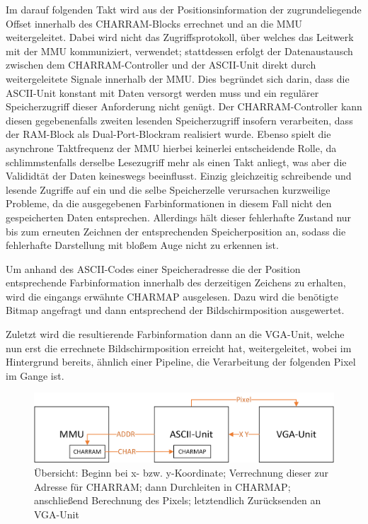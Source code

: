 Im darauf folgenden Takt wird aus der Positionsinformation der zugrundeliegende Offset innerhalb des CHARRAM-Blocks errechnet und an die MMU weitergeleitet. Dabei wird nicht das Zugriffsprotokoll, \"uber welches das Leitwerk mit der MMU kommuniziert, verwendet; stattdessen erfolgt der Datenaustausch zwischen dem CHARRAM-Controller und der ASCII-Unit direkt durch weitergeleitete Signale innerhalb der MMU. Dies begr\"undet sich darin, dass die ASCII-Unit konstant mit Daten versorgt werden muss und ein regul\"arer Speicherzugriff dieser Anforderung nicht gen\"ugt. Der CHARRAM-Controller kann diesen gegebenenfalls zweiten lesenden Speicherzugriff insofern verarbeiten, dass der RAM-Block als Dual-Port-Blockram realisiert wurde. Ebenso spielt die asynchrone Taktfrequenz der MMU hierbei keinerlei entscheidende Rolle, da schlimmstenfalls derselbe Lesezugriff mehr als einen Takt anliegt, was aber die Valididt\"at der Daten keineswegs beeinflusst. Einzig gleichzeitig schreibende und lesende Zugriffe auf ein und die selbe Speicherzelle verursachen kurzweilige Probleme, da die ausgegebenen Farbinformationen in diesem Fall nicht den gespeicherten Daten entsprechen. Allerdings h\"alt dieser fehlerhafte Zustand nur bis zum erneuten Zeichnen der entsprechenden Speicherposition an, sodass die fehlerhafte Darstellung mit blo\ss{}em Auge nicht zu erkennen ist.

Um anhand des ASCII-Codes einer Speicheradresse die der Position entsprechende Farbinformation innerhalb des derzeitigen Zeichens zu erhalten, wird die eingangs erw\"ahnte CHARMAP ausgelesen. Dazu wird die ben\"otigte Bitmap angefragt und dann entsprechend der Bildschirmposition ausgewertet. 

Zuletzt wird die resultierende Farbinformation dann an die VGA-Unit, welche nun erst die errechnete Bildschirmposition erreicht hat, weitergeleitet, wobei im Hintergrund bereits, \"ahnlich einer Pipeline, die Verarbeitung der folgenden Pixel im Gange ist.

\begin{figure}[H]
	\centering
	\label{fig:overview}
		\includegraphics[width=1.0\textwidth]{ASCII.png}
	\caption[\"Ubersicht \"uber die ASCII-Unit]{\"Ubersicht: Beginn bei x- bzw. y-Koordinate; Verrechnung dieser zur Adresse f\"ur CHARRAM; dann Durchleiten in CHARMAP; anschlie\ss{}end Berechnung des Pixels; letztendlich Zur\"ucksenden an VGA-Unit}
\end{figure}

\newpage


